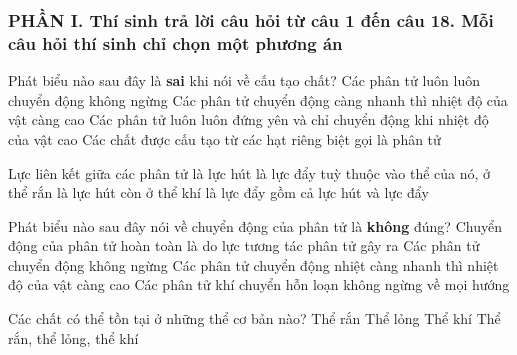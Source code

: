 \subsubsection*{PHẦN I. Thí sinh trả lời câu hỏi từ câu 1 đến câu 18. Mỗi câu hỏi thí sinh chỉ chọn một phương án}
\setcounter{ex}{0}
\begin{ex}%
	Phát biểu nào sau đây là \textbf{sai} khi nói về cấu tạo chất?	
	\choice
	{Các phân tử luôn luôn chuyển động không ngừng}
	{Các phân tử chuyển động càng nhanh thì nhiệt độ của vật càng cao}
	{\True Các phân tử luôn luôn đứng yên và chỉ chuyển động khi nhiệt độ của vật cao}
	{Các chất được cấu tạo từ các hạt riêng biệt gọi là phân tử}
\end{ex}


\begin{ex}%
	Lực liên kết giữa các phân tử	
	\choice
	{là lực hút}
	{là lực đẩy}
	{tuỳ thuộc vào thể của nó, ở thể rắn là lực hút còn ở thể khí là lực đẩy}
	{\True gồm cả lực hút và lực đẩy}
	\end{ex}

\begin{ex}%
	Phát biểu nào sau đây nói về chuyển động của phân tử là \textbf{không} đúng?
	\choice
	{\True Chuyển động của phân tử hoàn toàn là do lực tương tác phân tử gây ra}
	{Các phân tử chuyển động không ngừng}
	{Các phân tử chuyển động nhiệt càng nhanh thì nhiệt độ của vật càng cao}
	{Các phân tử khí chuyển hỗn loạn không ngừng về mọi hướng}

\end{ex}

\begin{ex}%
	Các chất có thể tồn tại ở những thể cơ bản nào?
	\choice
	{Thể rắn}
	{Thể lỏng}
	{Thể khí}
	{\True Thể rắn, thể lỏng, thể khí}
	\end{ex}

